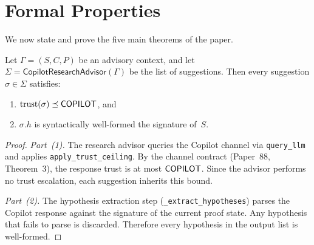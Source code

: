 \documentclass[11pt]{article}
\newcommand{\ResAdv}{\mathsf{CopilotResearchAdvisor}}
\begin{document}
\section{Formal Properties}\label{sec:formal}

We now state and prove the five main theorems of the paper.

\begin{theorem}\label{thm:soundness}
Let $\Gamma = (S, C, P)$ be an advisory context, and let
$\Sigma = \ResAdv(\Gamma)$ be the list of suggestions.
Then every suggestion $\sigma \in \Sigma$ satisfies:
\begin{enumerate}
\item $\mathrm{trust}(\sigma) \preceq \mathsf{COPILOT}$, and
\item $\sigma.h$ is syntactically well-formed \wrt{} the
      signature of~$S$.
\end{enumerate}
\end{theorem}
\begin{proof}
\emph{Part~(1).}
The research advisor queries the Copilot channel via
\texttt{query\_llm} and applies \texttt{apply\_trust\_ceiling}.
By the channel contract (Paper~88, Theorem~3), the response
trust is at most $\mathsf{COPILOT}$.  Since the advisor performs no
trust escalation, each suggestion inherits this bound.

\emph{Part~(2).}
The hypothesis extraction step (\texttt{\_extract\_hypotheses})
parses the Copilot response against the signature of the current
proof state.  Any hypothesis that fails to parse is discarded.
Therefore every hypothesis in the output list is well-formed.
\end{proof}
\end{document}

